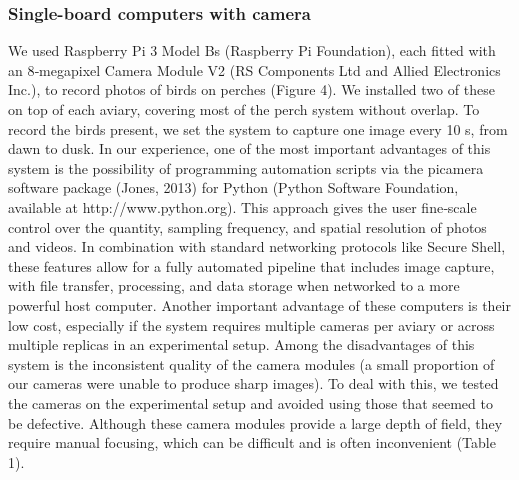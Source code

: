 \documentclass[11pt,a4paper,oneside]{book}
\begin{document}
\subsubsection{Single-board computers with camera}
We used Raspberry Pi 3 Model Bs (Raspberry Pi Foundation), each fitted with an 8‐megapixel Camera Module V2 (RS Components Ltd and Allied Electronics Inc.), to record photos of birds on perches (Figure 4). We installed two of these on top of each aviary, covering most of the perch system without overlap. To record the birds present, we set the system to capture one image every 10 s, from dawn to dusk. In our experience, one of the most important advantages of this system is the possibility of programming automation scripts via the picamera software package (Jones, 2013) for Python (Python Software Foundation, available at http://www.python.org). This approach gives the user fine‐scale control over the quantity, sampling frequency, and spatial resolution of photos and videos. In combination with standard networking protocols like Secure Shell, these features allow for a fully automated pipeline that includes image capture, with file transfer, processing, and data storage when networked to a more powerful host computer. Another important advantage of these computers is their low cost, especially if the system requires multiple cameras per aviary or across multiple replicas in an experimental setup. Among the disadvantages of this system is the inconsistent quality of the camera modules (a small proportion of our cameras were unable to produce sharp images). To deal with this, we tested the cameras on the experimental setup and avoided using those that seemed to be defective. Although these camera modules provide a large depth of field, they require manual focusing, which can be difficult and is often inconvenient (Table 1).
\end{document}
